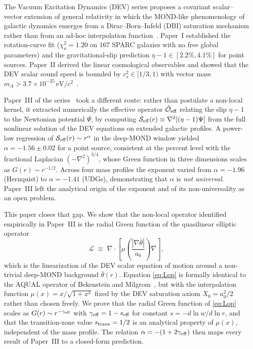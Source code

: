 \documentclass[aps,prd,twocolumn,superscriptaddress,nofootinbib]{revtex4-2}
\begin{document}
The Vacuum Excitation Dynamics (DEV) series proposes a covariant
scalar--vector extension of general relativity in which the
MOND-like phenomenology of galactic dynamics emerges from a
Dirac--Born--Infeld (DBI) saturation mechanism rather than from an
ad-hoc interpolation function~\cite{DEV_paperI,DEV_paperII}. Paper~I
established the rotation-curve fit ($\chi^2_\nu = 1.20$ on $167$
SPARC galaxies with no free global parameters) and the
gravitational-slip prediction $\eta - 1 \in [2.2\%, 4.1\%]$ for
point sources. Paper~II derived the linear cosmological observables
and showed that the DEV scalar sound speed is bounded by
$c_s^2 \in [1/3, 1)$ with vector mass $m_A > 3.7\times 10^{-25}\,
\mathrm{eV}/c^2$~\cite{DEV_paperII}.

Paper~III of the series~\cite{DEV_paperIII} took a different route:
rather than postulate a non-local kernel, it extracted numerically
the effective operator $\hat{\mathcal{O}}_{\rm eff}$ relating the
slip $\eta-1$ to the Newtonian potential $\Psi$, by computing
$\mathcal{S}_{\rm eff}(r) \equiv \nabla^2[(\eta-1)\Psi]$ from the
full nonlinear solution of the DEV equations on extended
galactic profiles. A power-law regression of
$\mathcal{S}_{\rm eff}(r)\sim r^{\alpha}$ in the deep-MOND window
yielded $\alpha = -1.56 \pm 0.02$ for a point source, consistent at
the percent level with the fractional Laplacian $(-\nabla^2)^{3/4}$,
whose Green function in three dimensions scales as
$G(r)\sim r^{-1/2}$. Across four mass profiles the exponent varied
from $\alpha = -1.96$ (Hernquist) to $\alpha = -1.41$ (UDGs),
demonstrating that $\alpha$ is \emph{not universal}. Paper~III left
the analytical origin of the exponent and of its non-universality as
an open problem.

This paper closes that gap. We show that the non-local operator
identified empirically in Paper~III is the radial Green function of
the quasilinear elliptic operator
\begin{equation}
\mathcal{L} \;\equiv\; \nabla\!\cdot\!\left[\mu\!\left(
  \frac{|\nabla\bar\theta|}{a_0}\right)\nabla\right],
\label{eq:Lop}
\end{equation}
which is the linearization of the DEV scalar equation of motion
around a non-trivial deep-MOND background $\bar\theta(r)$. Equation
\eqref{eq:Lop} is formally identical to the AQUAL operator of
Bekenstein and Milgrom~\cite{BM1984}, but with the interpolation
function $\mu(x)=x/\sqrt{1+x^2}$ fixed by the DEV saturation axiom
$X_0 = a_0^2/2$ rather than chosen freely. We prove that the radial
Green function of \eqref{eq:Lop} scales as $G(r)\sim r^{-\gamma_{\rm eff}}$
with $\gamma_{\rm eff} = 1 - s_{\rm eff}$ for constant
$s = -d\ln w/d\ln r$, and that the transition-zone value
$s_{\rm trans}=1/2$ is an analytical property of $\mu(x)$,
independent of the mass profile. The relation
$\alpha = -(1+2\gamma_{\rm eff})$ then maps every result of Paper~III
to a closed-form prediction.
\end{document}
